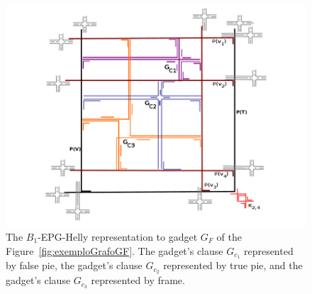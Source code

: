 \begin{figure}[htb]	
\center%
\includegraphics[width=1\textwidth]{./img/formulaGFCompletaSBPO3diferentes2.png}
\caption{The $B_{1}$-EPG-Helly representation to gadget $G_{F}$ of the Figure~\ref{fig:exemploGrafoGF}.%
 The gadget's clause $G_{c_1}$ represented by false pie, the gadget's clause $G_{c_2}$ represented by true pie, and the gadget's clause $G_{c_3}$ represented by frame.}
\label{fig:grafoFormula}
\end{figure}
